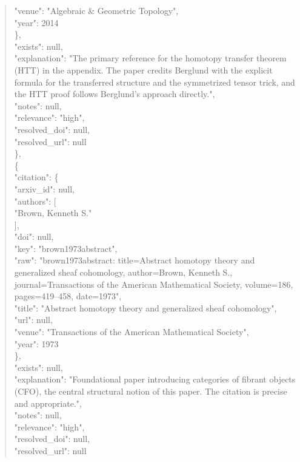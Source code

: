 \documentclass[11pt]{article}
\begin{document}
\begin{quote}
        "venue": "Algebraic \& Geometric Topology",\\
        "year": 2014\\
      \},\\
      "exists": null,\\
      "explanation": "The primary reference for the homotopy transfer theorem (HTT) in the appendix. The paper credits Berglund with the explicit formula for the transferred structure and the symmetrized tensor trick, and the HTT proof follows Berglund's approach directly.",\\
      "notes": null,\\
      "relevance": "high",\\
      "resolved\_doi": null,\\
      "resolved\_url": null\\
    \},\\
    \{\\
      "citation": \{\\
        "arxiv\_id": null,\\
        "authors": [\\
          "Brown, Kenneth S."\\
        ],\\
        "doi": null,\\
        "key": "brown1973abstract",\\
        "raw": "brown1973abstract: title=Abstract homotopy theory and generalized sheaf cohomology, author=Brown, Kenneth S., journal=Transactions of the American Mathematical Society, volume=186, pages=419--458, date=1973",\\
        "title": "Abstract homotopy theory and generalized sheaf cohomology",\\
        "url": null,\\
        "venue": "Transactions of the American Mathematical Society",\\
        "year": 1973\\
      \},\\
      "exists": null,\\
      "explanation": "Foundational paper introducing categories of fibrant objects (CFO), the central structural notion of this paper. The citation is precise and appropriate.",\\
      "notes": null,\\
      "relevance": "high",\\
      "resolved\_doi": null,\\
      "resolved\_url": null\\

\end{quote}
\end{document}
